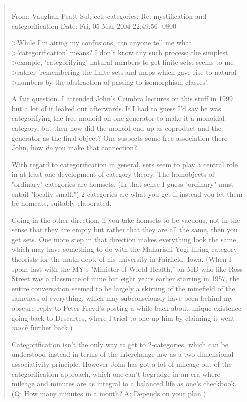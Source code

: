 \begin{quote}
\par\noindent\rule{\textwidth}{0.4pt}


From: 	 Vaughan Pratt 
Subject: categories: Re: mystification and categorification
Date: 	 Fri, 05 Mar 2004 22:49:56 -0800	

>While I'm airing my confusions, can anyone tell me what
>'categorification' means? I don't know any such process; the simplest
>exanple, 'categorifying' natural numbers to get finite sets, seems to me
>rather 'remembering the finite sets and maps which gave rise to natural
>numbers by the abstraction of passing to isomorphism classes'.

A fair question.  I attended John's Coimbra lectures on this stuff in 1999
but a lot of it leaked out afterwards.  If I had to guess I'd say he was
categorifying the free monoid on one generator to make it a monoidal category,
but then how did the monoid end up as coproduct and the generator as the
final object?  One suspects some free association there---John, how \emph{do}
you make that connection?

With regard to categorification in general, sets seem to play a central
role in at least one development of category theory.  The homobjects of
"ordinary" categories are homsets.  (In that sense I guess "ordinary" must
entail "locally small.")  2-categories are what you get if instead you let
them be homcats, suitably elaborated.

Going in the other direction, if you take homsets to be vacuous, not
in the sense that they are empty but rather that they are all the same,
then you get sets.  One more step in that direction makes everything look
the same, which may have something to do with the Maharishi Yogi hiring
category theorists for the math dept. of his university in Fairfield, Iowa.
(When I spoke last with the MY's "Minister of World Health," an MD who like
Ross Street was a classmate of mine but eight years earlier starting in 1957,
the entire conversation seemed to be largely a skirting of the minefield
of the sameness of everything, which may subconsciously have been behind my
obscure reply to Peter Freyd's posting a while back about unique existence
going back to Descartes, where I tried to one-up him by claiming it went
\emph{much} further back.)

Categorification isn't the only way to get to 2-categories, which can be
understood instead in terms of the interchange law as a two-dimensional
associativity principle.  However John has got a lot of mileage out of
the categorification approach, which one can't begrudge in an era where
mileage and minutes are as integral to a balanced life as one's checkbook.
(Q: How many minutes in a month?  A: Depends on your plan.)


\end{quote}
